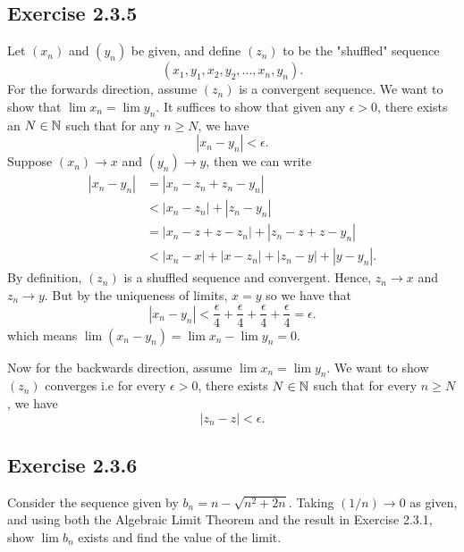 \subsection{Exercise 2.3.5}
Let \( (x_n)\) and \( (y_n)\) be given, and define \( (z_n)\) to be the "shuffled" sequence \[ (x_1, y_1, x_2, y_2 ,...,x_n, y_n).\] 
For the forwards direction, assume \( (z_n) \) is a convergent sequence. We want to show that \( \lim x_n = \lim y_n \). It suffices to show that given any \( \epsilon > 0\), there exists an \( N \in \mathbb{N} \) such that for any \( n \geq N \), we have 
\[ | x_n - y_n | < \epsilon.\]
Suppose \( (x_n) \to x\) and \( (y_n) \to y\), then we can write 
\begin{align*}
   | x_n - y_n  | &= | x_n - z_n + z_n - y_n |  \\
                  &< | x_n - z_n | + | z_n - y_n | \\  
                  &= | x_n - z + z - z_n | + | z_n - z + z - y_n | \\
                  &< | x_n - x | + | x - z_n | + | z_n - y | + | y - y_n |. \tag{1} 
\end{align*}
By definition, \( (z_n)\) is a shuffled sequence and convergent. Hence, \( z_n \to x \) and \( z_n \to y\). But by the uniqueness of limits, \( x = y\) so we have that 
\[ | x_n - y_n | < \frac{ \epsilon }{4} + \frac{ \epsilon }{4} +  \frac{ \epsilon }{4} + \frac{ \epsilon }{4} = \epsilon.\]
which means \( \lim (x_n - y_n) = \lim x_n - \lim y_n = 0\). 

Now for the backwards direction, assume \( \lim x_n = \lim y_n\). We want to show \( (z_n)\) converges i.e for every \( \epsilon> 0\), there exists \( N \in \mathbb{N} \) such that for every \( n \geq N \), we have 
\[ | z_n - z | < \epsilon.\]

\subsection{Exercise 2.3.6} 
Consider the sequence given by \( b_n = n - \sqrt{n^2 + 2n}\). Taking \( (1 / n ) \to 0\) as given, and using both the Algebraic Limit Theorem and the result in Exercise 2.3.1, show \( \lim b_n \) exists and find the value of the limit.

